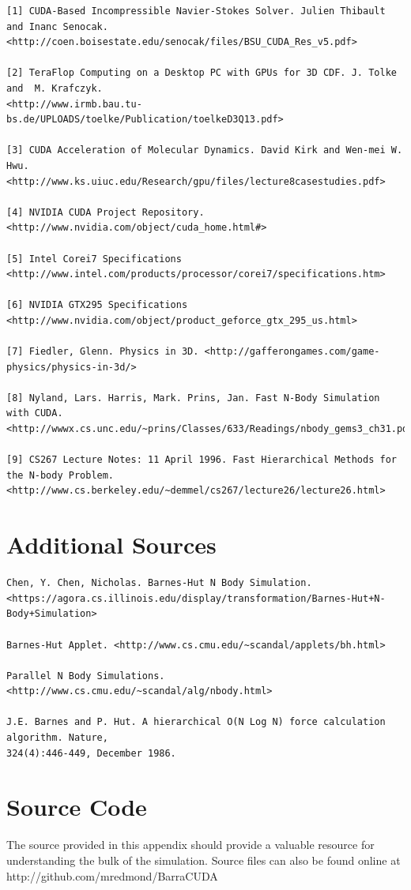 \documentclass[10pt]{article}
\begin{document}
\begin{verbatim}
[1] CUDA-Based Incompressible Navier-Stokes Solver. Julien Thibault and Inanc Senocak.
<http://coen.boisestate.edu/senocak/files/BSU_CUDA_Res_v5.pdf>

[2] TeraFlop Computing on a Desktop PC with GPUs for 3D CDF. J. Tolke and  M. Krafczyk.  
<http://www.irmb.bau.tu-bs.de/UPLOADS/toelke/Publication/toelkeD3Q13.pdf>

[3] CUDA Acceleration of Molecular Dynamics. David Kirk and Wen-mei W. Hwu.  
<http://www.ks.uiuc.edu/Research/gpu/files/lecture8casestudies.pdf>

[4] NVIDIA CUDA Project Repository. <http://www.nvidia.com/object/cuda_home.html#>

[5] Intel Corei7 Specifications <http://www.intel.com/products/processor/corei7/specifications.htm>

[6] NVIDIA GTX295 Specifications <http://www.nvidia.com/object/product_geforce_gtx_295_us.html>

[7] Fiedler, Glenn. Physics in 3D. <http://gafferongames.com/game-physics/physics-in-3d/>

[8] Nyland, Lars. Harris, Mark. Prins, Jan. Fast N-Body Simulation with CUDA. 
<http://wwwx.cs.unc.edu/~prins/Classes/633/Readings/nbody_gems3_ch31.pdf>

[9] CS267 Lecture Notes: 11 April 1996. Fast Hierarchical Methods for the N-body Problem.
<http://www.cs.berkeley.edu/~demmel/cs267/lecture26/lecture26.html>
\end{verbatim}

\section{Additional Sources}
\begin{verbatim}
Chen, Y. Chen, Nicholas. Barnes-Hut N Body Simulation. 
<https://agora.cs.illinois.edu/display/transformation/Barnes-Hut+N-Body+Simulation>

Barnes-Hut Applet. <http://www.cs.cmu.edu/~scandal/applets/bh.html>

Parallel N Body Simulations. <http://www.cs.cmu.edu/~scandal/alg/nbody.html>

J.E. Barnes and P. Hut. A hierarchical O(N Log N) force calculation algorithm. Nature,
324(4):446-449, December 1986.
\end{verbatim}

\clearpage
\appendix
\section{Source Code}
The source provided in this appendix should provide a valuable resource for understanding the bulk of the simulation. Source files can also be found online at http://github.com/mredmond/BarraCUDA
\end{document}
